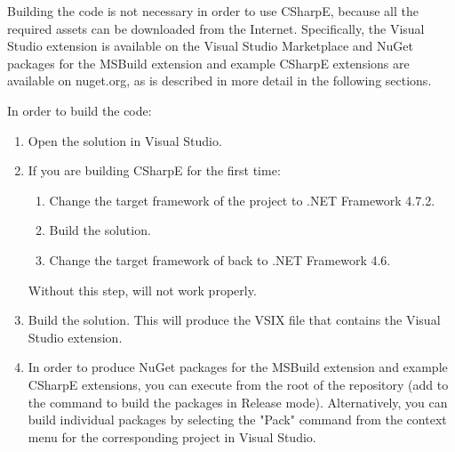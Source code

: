 Building the code is not necessary in order to use CSharpE, because all the required assets can be downloaded from the Internet. Specifically, the Visual Studio extension is available on the Visual Studio Marketplace and NuGet packages for the MSBuild extension and example CSharpE extensions are available on nuget.org, as is described in more detail in the following sections.

In order to build the code:

\begin{enumerate}
\item Open the solution  in Visual Studio.
\item If you are building CSharpE for the first time:

\begin{enumerate}
\item Change the target framework of the project  to .NET Framework 4.7.2.
\item Build the solution.
\item Change the target framework of  back to .NET Framework 4.6.
\end{enumerate}

Without this step,  will not work properly. \cite{iactg-net46}


\item Build the solution. This will produce the VSIX file that contains the Visual Studio extension.

\item In order to produce NuGet packages for the MSBuild extension and example CSharpE extensions, you can execute  from the root of the repository (add  to the command to build the packages in Release mode). Alternatively, you can build individual packages by selecting the "Pack" command from the context menu for the corresponding project in Visual Studio.


\end{enumerate}